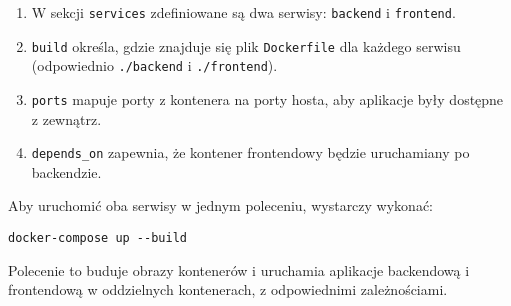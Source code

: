 \begin{enumerate}
    \item W sekcji \texttt{services} zdefiniowane są dwa serwisy: \texttt{backend} i \texttt{frontend}.
    \item \texttt{build} określa, gdzie znajduje się plik \texttt{Dockerfile} dla każdego serwisu (odpowiednio \texttt{./backend} i \texttt{./frontend}).
    \item \texttt{ports} mapuje porty z kontenera na porty hosta, aby aplikacje były dostępne z zewnątrz.
    \item \texttt{depends\_on} zapewnia, że kontener frontendowy będzie uruchamiany po backendzie.
\end{enumerate}

Aby uruchomić oba serwisy w jednym poleceniu, wystarczy wykonać:

\begin{verbatim}
docker-compose up --build
\end{verbatim}

Polecenie to buduje obrazy kontenerów i uruchamia aplikacje backendową i frontendową w oddzielnych kontenerach, z odpowiednimi zależnościami.
